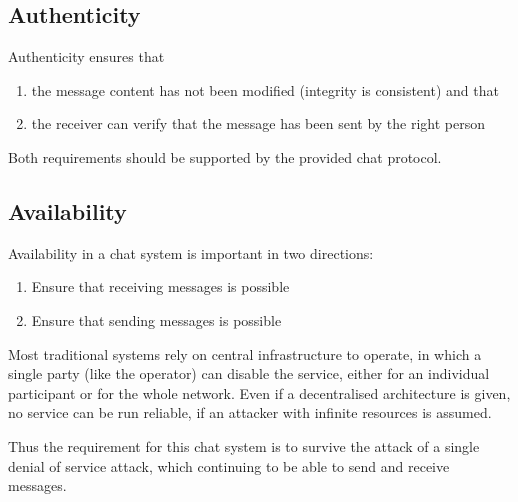 \subsection{Authenticity}
Authenticity ensures that
\begin{enumerate}
\item the message content has not been modified (integrity is consistent) and that
\item the receiver can verify that the message has been sent by the right person
\end{enumerate}
Both requirements should be supported by the provided chat protocol.
\subsection{Availability}
Availability in a chat system is important in two directions:
\begin{enumerate}
\item Ensure that receiving messages is possible
\item Ensure that sending messages is possible
\end{enumerate}
Most traditional systems rely on central infrastructure to operate, in which a
single party (like the operator) can disable the service, either for an individual
participant or for the whole network.
Even if a decentralised architecture is given,
no service can be run reliable, if an attacker with infinite resources is assumed.

Thus the requirement for this chat system is to survive the attack of 
a single denial of service attack, which continuing to
be able to send and receive messages.

